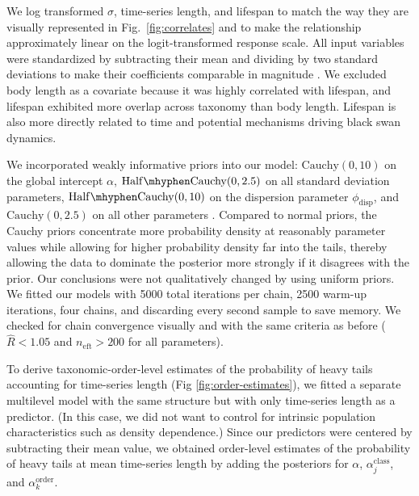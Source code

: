 We log transformed $\sigma$, time-series length, and lifespan to match the way
they are visually represented in Fig.~\ref{fig:correlates} and to make the
relationship approximately linear on the logit-transformed response scale. All
input variables were standardized by subtracting their mean and dividing by two
standard deviations to make their coefficients comparable in magnitude
\citep{gelman2008c}. We excluded body length as a covariate because it was
highly correlated with lifespan, and lifespan exhibited more overlap across
taxonomy than body length. Lifespan is also more directly related to time and
potential mechanisms driving black swan dynamics.

We incorporated weakly informative priors into our model: $\mathrm{Cauchy}(0,
10)$ on the global intercept $\alpha$, $\mathrm{Half\mhyphen Cauchy}(0, 2.5)$ on
all standard deviation parameters, $\mathrm{Half\mhyphen Cauchy}(0, 10)$ on the
dispersion parameter $\phi_\mathrm{disp}$, and $\mathrm{Cauchy}(0, 2.5)$ on all
other parameters \citep{gelman2006c, gelman2008d}. Compared to normal priors,
the Cauchy priors concentrate more probability density at reasonably parameter
values while allowing for higher probability density far into the tails, thereby
allowing the data to dominate the posterior more strongly if it disagrees with
the prior. Our conclusions were not qualitatively changed by using uniform
priors. We fitted our models with 5000 total iterations per chain, 2500 warm-up
iterations, four chains, and discarding every second sample to save memory. We
checked for chain convergence visually and with the same criteria as before
($\widehat{R} < 1.05$ and $n_\mathrm{eft} >200$ for all parameters).

To derive taxonomic-order-level estimates of the probability of heavy tails
accounting for time-series length (Fig \ref{fig:order-estimates}), we fitted
a separate multilevel model with the same structure but with only time-series
length as a predictor. (In this case, we did not want to control for intrinsic
population characteristics such as density dependence.) Since our predictors were
centered by subtracting their mean value, we obtained order-level
estimates of the probability of heavy tails at mean time-series length by
adding the posteriors for $\alpha$, $\alpha^\mathrm{class}_j$, and
$\alpha^\mathrm{order}_k$.





